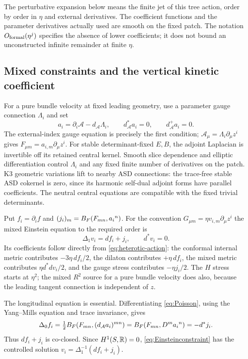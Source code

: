 The perturbative expansion below means the finite jet of this
tree action, order by order in $\eta$ and external derivatives.
The coefficient functions and the parameter derivatives actually
used are smooth on the fixed patch. The notation $O_{\mathrm{formal}}(\eta^j)$
specifies the absence of lower coefficients; it does not bound an
unconstructed infinite remainder at finite $\eta$.

\subsection{Mixed constraints and the vertical kinetic coefficient}
For a pure bundle velocity at fixed leading geometry, use a
parameter gauge connection $\Lambda_i$ and set
\begin{equation}\label{eq:horizontal-ASD}
 a_i=\partial_i\mathcal A-d_{\mathcal A}\Lambda_i,\qquad
 d_{\mathcal A}^*a_i=0,\qquad d_{\mathcal A}^+a_i=0.
\end{equation}
The external-index gauge equation is precisely the first condition;
$\mathcal A_\mu=\Lambda_i\partial_\mu z^i$ gives
$F_{\mu m}=a_{i,m}\partial_\mu z^i$. For stable determinant-fixed
$E,B$, the adjoint Laplacian is invertible off its retained central
kernel. Smooth slice dependence and elliptic differentiation control
$\Lambda_i$ and any fixed finite number of derivatives on the
patch. K3 geometric variations lift to nearby ASD connections:
the trace-free stable ASD cokernel is zero, since its harmonic
self-dual adjoint forms have parallel coefficients. The neutral
central equations are compatible with the fixed trivial determinants.

Put $f_i=\partial_i f$ and
$(j_i)_m=B_F(F_{mn},a_i{}^n)$. For the convention
$G_{\mu m}=\eta v_{i,m}\partial_\mu z^i$ the mixed Einstein
equation to the required order is
\begin{equation}\label{eq:Einsteinconstraint}
 \Delta_1v_i=df_i+j_i,\qquad d^*v_i=0.
\end{equation}
Its coefficients follow directly from
\eqref{eq:heterotic-action}: the conformal internal metric contributes
$-3\eta\,df_i/2$, the dilaton contributes $+\eta\,df_i$,
the mixed metric contributes $\eta d^*dv_i/2$, and the gauge
stress contributes $-\eta j_i/2$. The $H$ stress starts at
$\eta^2$; the mixed $R^2$ source for a pure bundle velocity does
also, because the leading tangent connection is independent of $z$.

The longitudinal equation is essential. Differentiating
\eqref{eq:Poisson}, using the Yang--Mills equation and trace invariance,
gives
\begin{equation}\label{eq:longitudinal}
 \Delta_0f_i=\tfrac12B_F(F_{mn},(d_{\mathcal A}a_i)^{mn})
 =B_F(F_{mn},D^ma_i{}^n)=-d^*j_i.
\end{equation}
Thus $df_i+j_i$ is co-closed. Since $H^1(S,\mathbb R)=0$,
\eqref{eq:Einsteinconstraint} has the controlled solution
$v_i=\Delta_1^{-1}(df_i+j_i)$.

